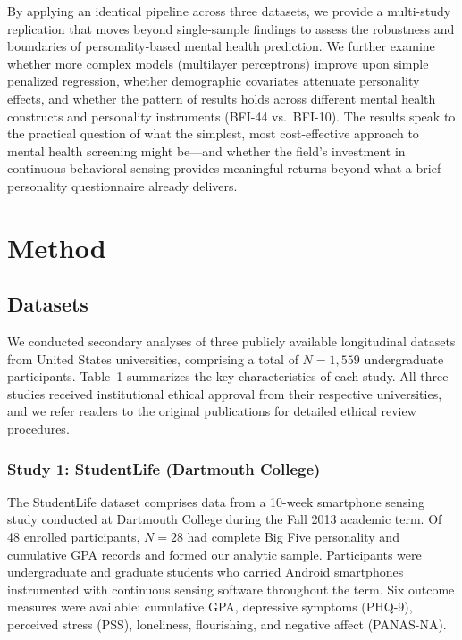 \documentclass[12pt, a4paper]{article}
\begin{document}
By applying an identical pipeline across three datasets, we provide a multi-study replication that moves beyond single-sample findings to assess the robustness and boundaries of personality-based mental health prediction. We further examine whether more complex models (multilayer perceptrons) improve upon simple penalized regression, whether demographic covariates attenuate personality effects, and whether the pattern of results holds across different mental health constructs and personality instruments (BFI-44 vs.\ BFI-10). The results speak to the practical question of what the simplest, most cost-effective approach to mental health screening might be---and whether the field's investment in continuous behavioral sensing provides meaningful returns beyond what a brief personality questionnaire already delivers.

\section{Method}

\subsection{Datasets}

We conducted secondary analyses of three publicly available longitudinal datasets from United States universities, comprising a total of $N = 1{,}559$ undergraduate participants. Table~1 summarizes the key characteristics of each study. All three studies received institutional ethical approval from their respective universities, and we refer readers to the original publications for detailed ethical review procedures.

\subsubsection{Study 1: StudentLife (Dartmouth College)}

The StudentLife dataset \citep{wang2014studentlife} comprises data from a 10-week smartphone sensing study conducted at Dartmouth College during the Fall 2013 academic term. Of 48 enrolled participants, $N = 28$ had complete Big Five personality and cumulative GPA records and formed our analytic sample. Participants were undergraduate and graduate students who carried Android smartphones instrumented with continuous sensing software throughout the term. Six outcome measures were available: cumulative GPA, depressive symptoms (PHQ-9), perceived stress (PSS), loneliness, flourishing, and negative affect (PANAS-NA).
\end{document}
